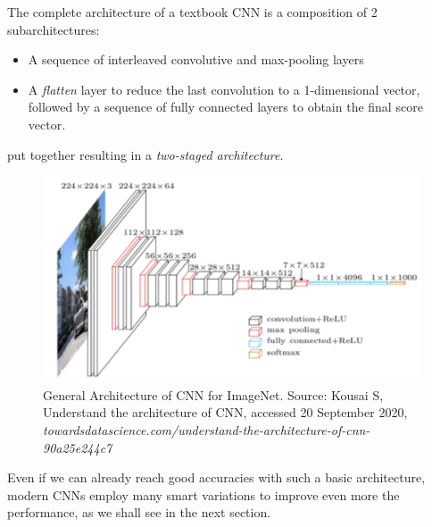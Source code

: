 \documentclass[LaM,binding=0.6cm]{./packages/sapthesis/sapthesis}
\begin{document}
            The complete architecture of a textbook CNN is a composition of 2 subarchitectures:
            \begin{itemize}
                \item A sequence of interleaved convolutive and max-pooling layers
                \item A \textit{flatten} layer to reduce the last convolution to a 1-dimensional vector, followed by a sequence of fully connected layers to obtain the final score vector.
            \end{itemize} 
            put together resulting in a  \textit{two-staged architecture}.
            \begin{figure}[h!!]
                \centering
                \includegraphics[scale=0.11]{cnnarch}
                \caption{General Architecture of CNN for ImageNet. Source: Kousai S, Understand the architecture of CNN, accessed 20 September 2020, \textit{towardsdatascience.com/understand-the-architecture-of-cnn-90a25e244c7}}
                \label{fig:cnnarch}
            \end{figure}
            
            Even if we can already reach good accuracies with such a basic architecture, modern CNNs employ many smart variations to improve even more the performance,
            as we shall see in the next section. 
\end{document}
